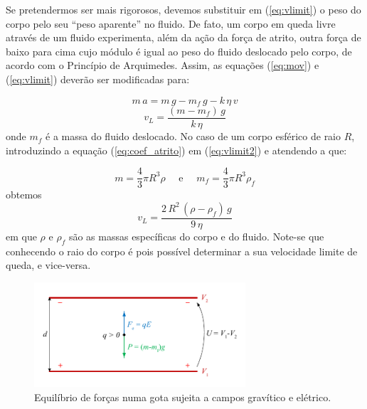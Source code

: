 \documentclass[12pt,a4paper,oneside]{paper}
\begin{document}

Se pretendermos ser mais rigorosos, devemos substituir  em (\ref{eq:vlimit}) o peso do corpo pelo seu “peso aparente” no
fluido. De fato, um corpo em queda livre através de um fluido experimenta, além da ação da força de atrito, outra força de
baixo para cima cujo módulo é igual ao peso do fluido deslocado pelo corpo, de acordo com o Princípio de Arquimedes. Assim,
as equações (\ref{eq:mov}) e (\ref{eq:vlimit}) deverão ser modificadas para:

\begin{equation}
	\label{eq:mov2}
	m\,a = m\,g - m_f\,g  - k  \, \eta \, v
\end{equation}
\begin{equation}
	\label{eq:vlimit2}
	v_L = \frac{(m - m_f)\,g}{k  \, \eta}
\end{equation}
onde $m_f$ é a massa do fluido deslocado. No caso de um corpo esférico de raio $R$, introduzindo a equação (\ref{eq:coef_atrito})
em (\ref{eq:vlimit2}) e atendendo a que:

\begin{equation*}
	m = \frac{4}{3} \pi R^3 \rho \quad \textrm{  e } \quad  m_f = \frac{4}{3} \pi R^3 \rho_f
\end{equation*}
obtemos
\begin{equation}
	\label{eq:vlimit3}
	v_L = \frac{2\,R^2\, (\rho - \rho_f)\,g}{9  \, \eta}
\end{equation}
em que $\rho$  e $\rho_f$ são as massas específicas do corpo e do fluido. Note-se que conhecendo o raio do corpo é pois possível
determinar  a sua velocidade limite de queda, e vice-versa.

%


\begin{figure}[H]
	[tb]  \centering 
	\includegraphics[width=0.7\textwidth]{./milikan_images/F_equil}
	\caption{Equilíbrio de forças numa gota sujeita a campos gravítico e elétrico. \label{fig:f_equil}} 
\end{figure}
\end{document}
